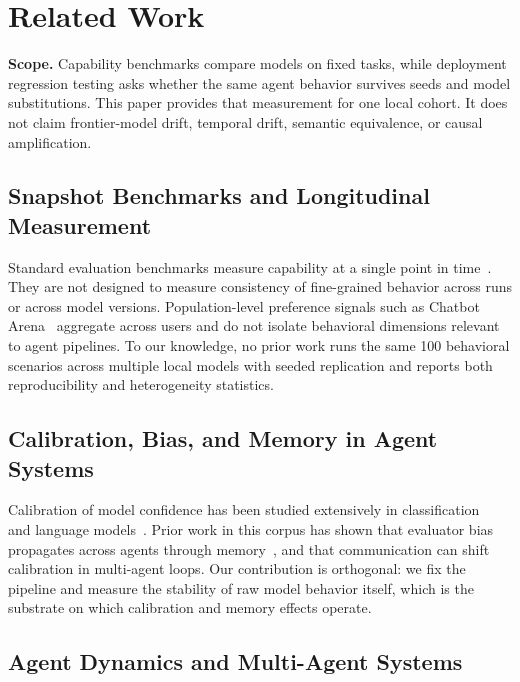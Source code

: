 \documentclass[11pt]{article}
\begin{document}
\section{Related Work}
\textbf{Scope.} Capability benchmarks compare models on fixed tasks, while
deployment regression testing asks whether the same agent behavior survives
seeds and model substitutions. This paper provides that measurement for one
local cohort. It does not claim frontier-model drift, temporal drift,
semantic equivalence, or causal amplification.


\label{sec:related}

\subsection{Snapshot Benchmarks and Longitudinal Measurement}

Standard evaluation benchmarks measure capability at a single point in
time~\citep{hendrycks2021mmlu,liang2022helm,chen2021humaneval}. They are
not designed to measure consistency of fine-grained behavior across runs or
across model versions. Population-level preference signals such as Chatbot
Arena~\citep{chiang2024chatbot} aggregate across users and do not isolate
behavioral dimensions relevant to agent pipelines. To our knowledge, no
prior work runs the same 100 behavioral scenarios across multiple local
models with seeded replication and reports both reproducibility and
heterogeneity statistics.

\subsection{Calibration, Bias, and Memory in Agent Systems}

Calibration of model confidence has been studied extensively in
classification~\citep{guo2017calibration} and language
models~\citep{kadavath2022language}. Prior work in this corpus has shown
that evaluator bias propagates across agents through
memory~\citep{liu2026memorycontagion}, and that communication can shift
calibration in multi-agent loops. Our contribution is orthogonal: we fix
the pipeline and measure the stability of raw model behavior itself, which
is the substrate on which calibration and memory effects operate.

\subsection{Agent Dynamics and Multi-Agent Systems}
\end{document}
